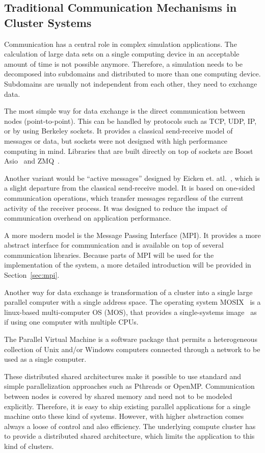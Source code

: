 \subsection{Traditional Communication Mechanisms in Cluster Systems}
\label{sec:communication}
Communication has a central role in complex simulation
applications. The calculation of large data sets on a single computing
device in an acceptable amount of time is not possible anymore.
Therefore, a simulation needs to be decomposed into subdomains and
distributed to more than one computing device. Subdomains are usually
not independent from each other, they need to exchange data.

The most simple way for data exchange is the direct communication
between nodes (point-to-point).  This can be handled by protocols such
as TCP, UDP, IP, or by using Berkeley sockets. It provides a classical
send-receive model of messages or data, but sockets were not designed
with high performance computing in mind. Libraries that are built
directly on top of sockets are Boost Asio~\cite{ref:boost_asio} and
ZMQ~\cite{ref:zmq}.

Another variant would be ``active messages'' designed by Eicken
et. atl.~\cite{ref:am}, which is a slight departure from the classical
send-receive model. It is based on one-sided communication operations,
which transfer messages regardless of the current activity of the
receiver process. It was designed to reduce the impact of
communication overhead on application performance.

A more modern model is the Message Passing Interface (MPI). It
provides a more abstract interface for communication and is available
on top of several communication libraries. Because parts of MPI will
be used for the implementation of the system, a more detailed
introduction will be provided in Section~\ref{sec:mpi}.

Another way for data exchange is transformation of a cluster into a
single large parallel computer with a single address space.  The
operating system MOSIX~\cite{ref:mosix} is a linux-based
multi-computer OS (MOS), that provides a single-systems
image~\cite{ref:single_system_image} as if using one computer with
multiple CPUs.

The Parallel Virtual Machine\cite{ref:pvm} is a
software package that permits a heterogeneous collection of Unix
and/or Windows computers connected through a network to be used as a
single computer.

These distributed shared architectures make it possible to use
standard and simple parallelization approaches such as Pthreads or
OpenMP.  Communication between nodes is covered by shared memory and
need not to be modeled explicitly.  Therefore, it is easy to ship
existing parallel applications for a single machine onto these kind of
systems. However, with higher abstraction comes always a loose of control
and also efficiency. The underlying compute cluster has to provide
a distributed shared architecture, which limits the application to this kind of
clusters.

